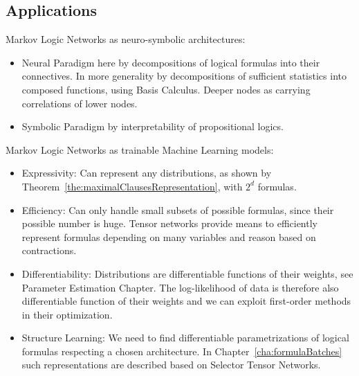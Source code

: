 \subsection{Applications}

Markov Logic Networks as neuro-symbolic architectures:
\begin{itemize}
	\item Neural Paradigm here by decompositions of logical formulas into their connectives.
		In more generality by decompositions of sufficient statistics into composed functions, using Basis Calculus.
		Deeper nodes as carrying correlations of lower nodes.
	\item Symbolic Paradigm by interpretability of propositional logics.
\end{itemize}


Markov Logic Networks as trainable Machine Learning models:
\begin{itemize}
	\item Expressivity: Can represent any distributions, as shown by Theorem~\ref{the:maximalClausesRepresentation}, with $2^d$ formulas.
	\item Efficiency: Can only handle small subsets of possible formulas, since their possible number is huge.
		Tensor networks provide means to efficiently represent formulas depending on many variables and reason based on contractions.
	\item Differentiability: Distributions are differentiable functions of their weights, see Parameter Estimation Chapter. 
		The log-likelihood of data is therefore also differentiable function of their weights and we can exploit first-order methods in their optimization.
	\item Structure Learning: We need to find differentiable parametrizations of logical formulas respecting a chosen architecture.
		In Chapter~\ref{cha:formulaBatches} such representations are described based on Selector Tensor Networks.
\end{itemize}













